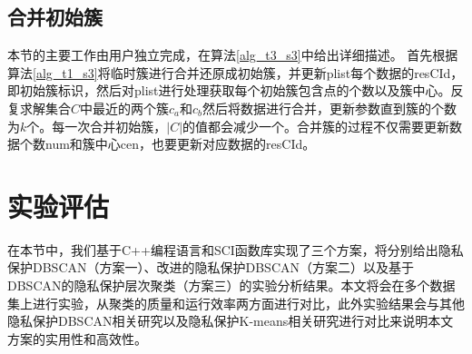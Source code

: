 \subsection{合并初始簇}
本节的主要工作由用户独立完成，在算法\ref{alg_t3_s3}中给出详细描述。
首先根据算法\ref{alg_t1_s3}将临时簇进行合并还原成初始簇，并更新plist每个数据的resCId，即初始簇标识，然后对plist进行处理获取每个初始簇包含点的个数以及簇中心。反复求解集合$ C $中最近的两个簇$ c_a $和$ c_b $然后将数据进行合并，更新参数直到簇的个数为$ k $个。每一次合并初始簇，$ |C| $的值都会减少一个。合并簇的过程不仅需要更新数据个数num和簇中心cen，也要更新对应数据的resCId。
\section{实验评估}
\label{s4-shiyan}
在本节中，我们基于C++编程语言和SCI函数库\cite{rathee2020cryptflow2}实现了三个方案，将分别给出隐私保护DBSCAN（方案一）、改进的隐私保护DBSCAN（方案二）以及基于DBSCAN的隐私保护层次聚类（方案三）的实验分析结果。本文将会在多个数据集上进行实验，从聚类的质量和运行效率两方面进行对比，此外实验结果会与其他隐私保护DBSCAN相关研究\cite{bozdemir2021privacy}以及隐私保护K-means相关研究\cite{mohassel2019practical}进行对比来说明本文方案的实用性和高效性。

